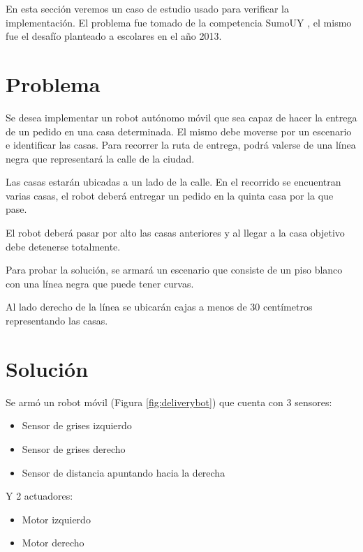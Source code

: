 
  En esta sección veremos un caso de estudio usado para verificar la
implementación.
  El problema fue tomado de la competencia SumoUY \cite{sumouy}, el mismo
fue el desafío planteado a escolares en el año 2013.

\section {Problema}

  Se desea implementar un robot autónomo móvil que sea capaz de
hacer la entrega de un pedido en una casa determinada.
  El mismo debe moverse por un escenario e identificar las casas.
  Para recorrer la ruta de entrega, podrá valerse de una línea negra
que representará la calle de la ciudad.

  Las casas estarán ubicadas a un lado de la calle. En el recorrido
se encuentran varias casas, el robot deberá entregar un pedido
en la quinta casa por la que pase.

  El robot deberá pasar por alto las casas anteriores y
al llegar a la casa objetivo debe detenerse totalmente.

  Para probar la solución, se armará un escenario que consiste de
un piso blanco con una línea negra que puede tener curvas.

  Al lado derecho de la línea se ubicarán cajas a menos de 30
centímetros representando las casas.

\section {Solución}

Se armó un robot móvil (Figura \ref{fig:deliverybot}) que cuenta con 3 sensores:

\begin{itemize}
\item Sensor de grises izquierdo
\item Sensor de grises derecho
\item Sensor de distancia apuntando hacia la derecha
\end{itemize}

  Y 2 actuadores:

\begin{itemize}
\item Motor izquierdo
\item Motor derecho 
\end{itemize}

